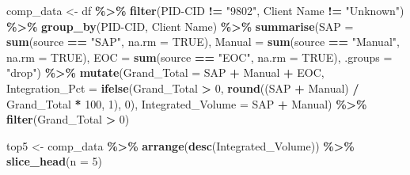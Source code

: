 \documentclass[
]{article}
\newenvironment{Shaded}{\begin{snugshade}}{\end{snugshade}}
\newcommand{\AttributeTok}[1]{\textcolor[rgb]{0.13,0.29,0.53}{#1}}
\newcommand{\ConstantTok}[1]{\textcolor[rgb]{0.56,0.35,0.01}{#1}}
\newcommand{\DecValTok}[1]{\textcolor[rgb]{0.00,0.00,0.81}{#1}}
\newcommand{\FunctionTok}[1]{\textcolor[rgb]{0.13,0.29,0.53}{\textbf{#1}}}
\newcommand{\NormalTok}[1]{#1}
\newcommand{\OtherTok}[1]{\textcolor[rgb]{0.56,0.35,0.01}{#1}}
\newcommand{\SpecialCharTok}[1]{\textcolor[rgb]{0.81,0.36,0.00}{\textbf{#1}}}
\newcommand{\StringTok}[1]{\textcolor[rgb]{0.31,0.60,0.02}{#1}}
\begin{document}
\begin{Shaded}
\begin{Highlighting}[]
\NormalTok{      comp\_data }\OtherTok{\textless{}{-}}\NormalTok{ df }\SpecialCharTok{\%\textgreater{}\%}
        \FunctionTok{filter}\NormalTok{(}\StringTok{\textasciigrave{}}\AttributeTok{PID{-}CID}\StringTok{\textasciigrave{}} \SpecialCharTok{!=} \StringTok{"9802"}\NormalTok{, }\StringTok{\textasciigrave{}}\AttributeTok{Client Name}\StringTok{\textasciigrave{}} \SpecialCharTok{!=} \StringTok{"Unknown"}\NormalTok{) }\SpecialCharTok{\%\textgreater{}\%}
        \FunctionTok{group\_by}\NormalTok{(}\StringTok{\textasciigrave{}}\AttributeTok{PID{-}CID}\StringTok{\textasciigrave{}}\NormalTok{, }\StringTok{\textasciigrave{}}\AttributeTok{Client Name}\StringTok{\textasciigrave{}}\NormalTok{) }\SpecialCharTok{\%\textgreater{}\%}
        \FunctionTok{summarise}\NormalTok{(}\AttributeTok{SAP =} \FunctionTok{sum}\NormalTok{(source }\SpecialCharTok{==} \StringTok{"SAP"}\NormalTok{, }\AttributeTok{na.rm =} \ConstantTok{TRUE}\NormalTok{),}
                  \AttributeTok{Manual =} \FunctionTok{sum}\NormalTok{(source }\SpecialCharTok{==} \StringTok{"Manual"}\NormalTok{, }\AttributeTok{na.rm =} \ConstantTok{TRUE}\NormalTok{),}
                  \AttributeTok{EOC =} \FunctionTok{sum}\NormalTok{(source }\SpecialCharTok{==} \StringTok{"EOC"}\NormalTok{, }\AttributeTok{na.rm =} \ConstantTok{TRUE}\NormalTok{), }\AttributeTok{.groups =} \StringTok{"drop"}\NormalTok{) }\SpecialCharTok{\%\textgreater{}\%}
        \FunctionTok{mutate}\NormalTok{(}\AttributeTok{Grand\_Total =}\NormalTok{ SAP }\SpecialCharTok{+}\NormalTok{ Manual }\SpecialCharTok{+}\NormalTok{ EOC,}
               \AttributeTok{Integration\_Pct =} \FunctionTok{ifelse}\NormalTok{(Grand\_Total }\SpecialCharTok{\textgreater{}} \DecValTok{0}\NormalTok{, }\FunctionTok{round}\NormalTok{((SAP }\SpecialCharTok{+}\NormalTok{ Manual) }\SpecialCharTok{/}\NormalTok{ Grand\_Total }\SpecialCharTok{*} \DecValTok{100}\NormalTok{, }\DecValTok{1}\NormalTok{), }\DecValTok{0}\NormalTok{),}
               \AttributeTok{Integrated\_Volume =}\NormalTok{ SAP }\SpecialCharTok{+}\NormalTok{ Manual) }\SpecialCharTok{\%\textgreater{}\%}
        \FunctionTok{filter}\NormalTok{(Grand\_Total }\SpecialCharTok{\textgreater{}} \DecValTok{0}\NormalTok{)}
      
\NormalTok{      top5 }\OtherTok{\textless{}{-}}\NormalTok{ comp\_data }\SpecialCharTok{\%\textgreater{}\%} \FunctionTok{arrange}\NormalTok{(}\FunctionTok{desc}\NormalTok{(Integrated\_Volume)) }\SpecialCharTok{\%\textgreater{}\%} \FunctionTok{slice\_head}\NormalTok{(}\AttributeTok{n =} \DecValTok{5}\NormalTok{)}
      

\end{Highlighting}
\end{Shaded}
\end{document}
